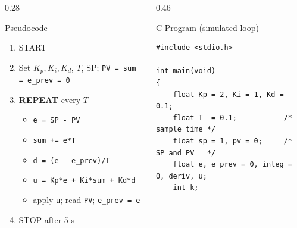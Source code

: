 \documentclass[aspectratio=169]{beamer}
\begin{document}
	\begin{frame}{}

		\vspace*{0.05cm}

		\begin{columns}[T,onlytextwidth]


			\begin{column}{0.28\textwidth}

				\begin{block}{Pseudocode}
					\scriptsize
					\begin{enumerate}
						\item START
						\item Set $K_p, K_i, K_d$, $T$, SP; \texttt{PV = sum = e\_prev = 0}
						\item \textbf{REPEAT} every $T$
						\begin{itemize}\scriptsize
							\item \texttt{e = SP - PV}
							\item \texttt{sum += e*T}
							\item \texttt{d = (e - e\_prev)/T}
							\item \texttt{u = Kp*e + Ki*sum + Kd*d}
							\item apply \texttt{u}; read \texttt{PV}; \texttt{e\_prev = e}
						\end{itemize}
						\item STOP after 5 s
					\end{enumerate}
				\end{block}

			\end{column}


			\hspace*{0.3cm}
			\begin{column}{0.46\textwidth}

				\begin{block}{C Program (simulated loop)}

\begin{lstlisting}[style=cstyle,numbers=none,basicstyle=\ttfamily\scriptsize]
#include <stdio.h>

int main(void)
{
	float Kp = 2, Ki = 1, Kd = 0.1;
	float T  = 0.1;           /* sample time */
	float sp = 1, pv = 0;     /* SP and PV   */
	float e, e_prev = 0, integ = 0, deriv, u;
	int k;


\end{lstlisting}
\end{block}
\end{column}
\end{columns}
\end{frame}
\end{document}
